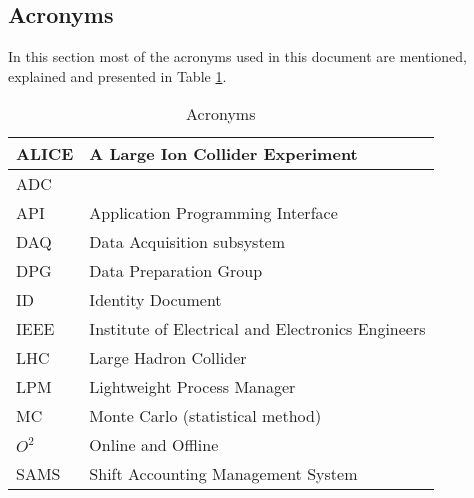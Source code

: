 \subsection{Acronyms} 
In this section most of the acronyms used in this document are mentioned, explained and presented in Table \ref{tab:acronyms}.
\begin{table}[h]
\begin{center}
\begin{longtable}{ll}
    \hline
    ALICE & A Large Ion Collider Experiment\\
    \hline
    ADC & \\
    \hline
    API & Application Programming Interface\\
    \hline
    DAQ & Data Acquisition subsystem \\
    \hline
    DPG & Data Preparation Group\\
    \hline
    ID & Identity Document\\
    \hline
    IEEE & Institute of Electrical and Electronics Engineers\\
    \hline
     LHC  & Large Hadron Collider\\
     \hline
     LPM & Lightweight Process Manager \\
     \hline
     MC & Monte Carlo (statistical method)\\
     \hline
     $O^2$ & Online and Offline\\
     \hline
     SAMS & Shift Accounting Management System \\
     \hline
    \end{longtable}
      \caption{Acronyms}
  \label{tab:acronyms}
  \end{center}
  
\end{table}

